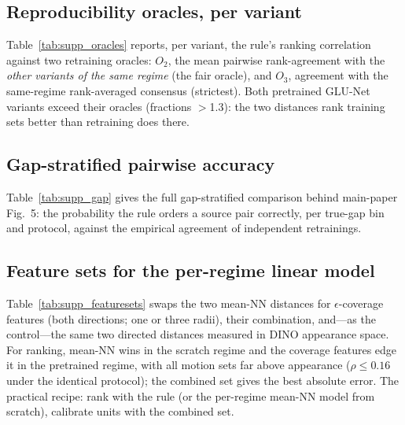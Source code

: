\documentclass[runningheads]{llncs}
\newcommand{\pck}{PCK}
\begin{document}
\subsection{Reproducibility oracles, per variant}
Table~\ref{tab:supp_oracles} reports, per variant, the rule's ranking
correlation against two retraining oracles: $O_2$, the mean pairwise
rank-agreement with the \emph{other variants of the same regime} (the fair
oracle), and $O_3$, agreement with the same-regime rank-averaged consensus
(strictest). Both pretrained GLU-Net variants exceed their oracles
(fractions $>$1.3): the two distances rank training sets better than
retraining does there.

\begin{table}[h]
\centering
\caption{Rule vs.\ retraining-reproducibility oracles, per variant.}
\label{tab:supp_oracles}
\small

\end{table}

\subsection{Gap-stratified pairwise accuracy}
Table~\ref{tab:supp_gap} gives the full gap-stratified comparison behind
main-paper Fig.~5: the probability the rule orders a source pair correctly,
per true-gap bin and protocol, against the empirical agreement of independent
retrainings.

\begin{table}[h]
\centering
\caption{Pairwise ordering accuracy by true \pck{} gap.}
\label{tab:supp_gap}
\small

\end{table}

\subsection{Feature sets for the per-regime linear model}
Table~\ref{tab:supp_featuresets} swaps the two mean-NN distances for
$\epsilon$-coverage features (both directions; one or three radii), their
combination, and---as the control---the same two directed distances measured
in DINO appearance space. For ranking, mean-NN wins in the scratch regime
and the coverage features edge it in the pretrained regime, with all motion
sets far above appearance ($\rho \le 0.16$ under the identical protocol);
the combined set gives the best absolute error. The practical recipe:
rank with the rule (or the per-regime mean-NN model from scratch), calibrate
units with the combined set.
\end{document}
